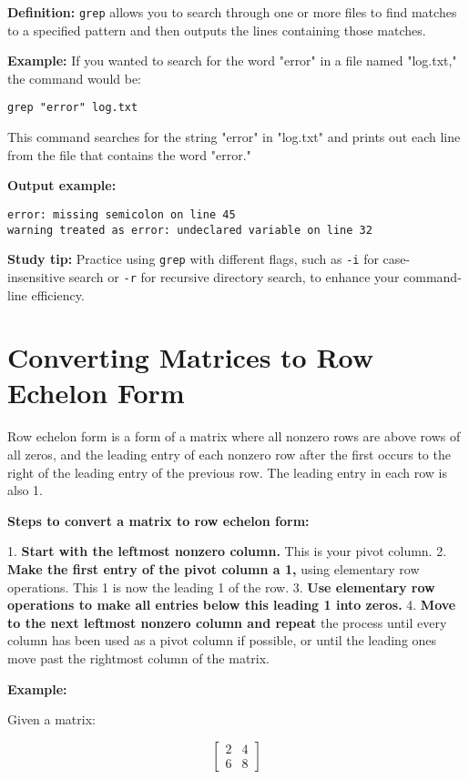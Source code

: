\documentclass{article}
\begin{document}
\textbf{Definition:} \texttt{grep} allows you to search through one or more files to find matches to a specified pattern and then outputs the lines containing those matches.

\textbf{Example:} If you wanted to search for the word "error" in a file named "log.txt," the command would be:

\begin{verbatim}
grep "error" log.txt
\end{verbatim}

This command searches for the string "error" in "log.txt" and prints out each line from the file that contains the word "error."

\textbf{Output example:}

\begin{verbatim}
error: missing semicolon on line 45
warning treated as error: undeclared variable on line 32
\end{verbatim}

\textbf{Study tip:} Practice using \texttt{grep} with different flags, such as \texttt{-i} for case-insensitive search or \texttt{-r} for recursive directory search, to enhance your command-line efficiency.

\section{Converting Matrices to Row Echelon Form}

Row echelon form is a form of a matrix where all nonzero rows are above rows of all zeros, and the leading entry of each nonzero row after the first occurs to the right of the leading entry of the previous row. The leading entry in each row is also 1.

\textbf{Steps to convert a matrix to row echelon form:}

1. \textbf{Start with the leftmost nonzero column.} This is your pivot column.
2. \textbf{Make the first entry of the pivot column a 1,} using elementary row operations. This 1 is now the leading 1 of the row.
3. \textbf{Use elementary row operations to make all entries below this leading 1 into zeros.}
4. \textbf{Move to the next leftmost nonzero column and repeat} the process until every column has been used as a pivot column if possible, or until the leading ones move past the rightmost column of the matrix.

\textbf{Example:}

Given a matrix:

\[ \begin{bmatrix} 2 & 4 \\ 6 & 8 \end{bmatrix} \]
\end{document}
